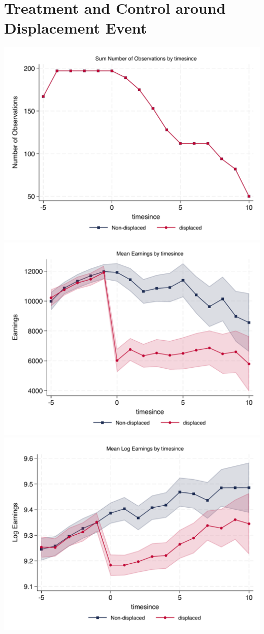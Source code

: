 \documentclass{article}
\begin{document}
\section{Treatment and Control around Displacement Event}
\includegraphics[width = .9\textwidth]{Disp_event_raw/counts_by_timesince.pdf} \\ 
\includegraphics[width = .9\textwidth]{Disp_event_raw/logearn_by_timesince.pdf} \\ 
\includegraphics[width = .9\textwidth]{Disp_event_raw/earn_by_timesince.pdf} \\ 
\end{document}
